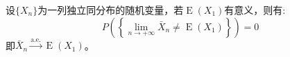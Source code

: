 \begin{theorem}
	\label{theo:StrongLawOfLargeNumbers}
	设$\{X_n\}$为一列独立同分布的随机变量，若$\operatorname{E}(X_1)$有意义，则有:
	\begin{equation*}
		P\left(\left\{\lim_{n\to+\infty}\bar{X}_n\ne\operatorname{E}(X_1)\right\}\right)=0
	\end{equation*}
	即$\bar{X}_n\overset{\text{a.e.}}{\longrightarrow}\operatorname{E}(X_1)$。
\end{theorem}
